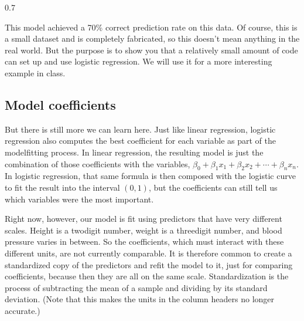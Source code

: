 \documentclass[letterpaper,10pt,english]{jupyterBook}
\begin{document}
\begin{sphinxVerbatim}[commandchars=\\\{\}]
\PYG{p}{[}\PYG{p}{]}  
\end{sphinxVerbatim}

\begin{sphinxVerbatim}[commandchars=\\\{\}]
0.7
\end{sphinxVerbatim}

\sphinxAtStartPar
This model achieved a 70\% correct prediction rate on this data.  Of course, this is a small dataset and is completely fabricated, so this doesn’t mean anything in the real world.  But the purpose is to show you that a relatively small amount of code can set up and use logistic regression.  We will use it for a more interesting example in class.


\subsection{Model coefficients}
\label{\detokenize{chapter-17-machine-learning:model-coefficients}}
\sphinxAtStartPar
But there is still more we can learn here.  Just like linear regression, logistic regression also computes the best coefficient for each variable as part of the model\sphinxhyphen{}fitting process.  In linear regression, the resulting model is just the combination of those coefficients with the variables, \(\beta_0+\beta_1x_1+\beta_2x_2+\cdots+\beta_nx_n\).  In logistic regression, that same formula is then composed with the logistic curve to fit the result into the interval \((0,1)\), but the coefficients can still tell us which variables were the most important.

\sphinxAtStartPar
Right now, however, our model is fit using predictors that have very different scales.  Height is a two\sphinxhyphen{}digit number, weight is a three\sphinxhyphen{}digit number, and blood pressure varies in between.  So the coefficients, which must interact with these different units, are not currently comparable.  It is therefore common to create a standardized copy of the predictors and re\sphinxhyphen{}fit the model to it, just for comparing coefficients, because then they are all on the same scale.  Standardization is the process of subtracting the mean of a sample and dividing by its standard deviation.  (Note that this makes the units in the column headers no longer accurate.)
\end{document}
